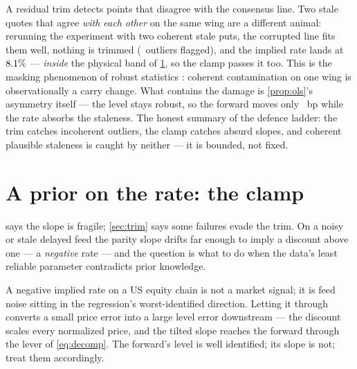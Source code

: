 \documentclass[11pt]{article}
\begin{document}
\begin{remark}
\label{rem:masking}
A residual trim detects points that disagree with the consensus line.  Two
stale quotes that agree \emph{with each other} on the same wing are a
different animal: rerunning the experiment with two coherent stale puts,
the corrupted line fits them well, nothing is trimmed
(\fwdinfmasknout\ outliers flagged), and the implied rate lands at
$8.1\%$ --- \emph{inside} the physical band of
\cref{sec:clamp}, so the clamp passes it too.  This is the masking
phenomenon of robust statistics \cite{RousseeuwLeroy1987}: coherent
contamination on one wing is observationally a carry change.  What
contains the damage is \cref{prop:ols}'s asymmetry itself --- the level
stays robust, so the forward moves only \fwdinfmaskbp\ bp while the rate
absorbs the staleness.  The honest summary of the defence ladder: the trim
catches incoherent outliers, the clamp catches absurd slopes, and coherent
plausible staleness is caught by neither --- it is bounded, not fixed.
\end{remark}

\section{A prior on the rate: the clamp}
\label{sec:clamp}

 says the slope is fragile; \cref{sec:trim} says some
failures evade the trim.  On a noisy or stale delayed feed the parity
slope drifts far enough to imply a discount above one --- a
\emph{negative} rate --- and the question is what to do when the data's
least reliable parameter contradicts prior knowledge.

\begin{caution}
A negative implied rate on a US equity chain is not a market signal; it is
feed noise sitting in the regression's worst-identified direction.
Letting it through converts a small price error into a large level error
downstream --- the discount scales every normalized price, and the tilted
slope reaches the forward through the lever of \eqref{eq:decomp}.  The
forward's level is well identified; its slope is not; treat them
accordingly.
\end{caution}
\end{document}
